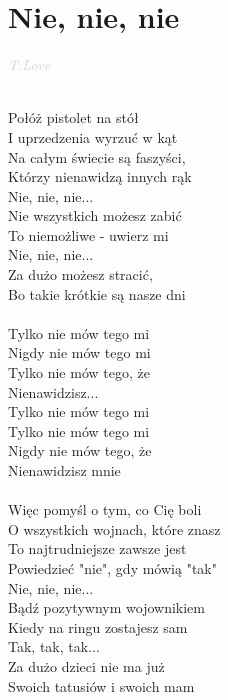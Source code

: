 \documentclass[a5paper, 10pt]{book}
\begin{document}
\newpage
\section{Nie, nie, nie}\textcolor{lightgray}{\textit{T.Love}}\\~\\
\begin{minipage}[t]{0.6\textwidth}
Połóż pistolet na stół\\
I uprzedzenia wyrzuć w kąt\\
Na całym świecie są faszyści,\\
Którzy nienawidzą innych rąk\\
Nie, nie, nie...\\
Nie wszystkich możesz zabić\\
To niemożliwe - uwierz mi\\
Nie, nie, nie...\\
Za dużo możesz stracić,\\
Bo takie krótkie są nasze dni\\
\\
\hspace*{5mm}Tylko nie mów tego mi\\
\hspace*{5mm}Nigdy nie mów tego mi\\
\hspace*{5mm}Tylko nie mów tego, że\\
\hspace*{5mm}Nienawidzisz...\\
\hspace*{5mm}Tylko nie mów tego mi\\
\hspace*{5mm}Tylko nie mów tego mi\\
\hspace*{5mm}Nigdy nie mów tego, że\\
\hspace*{5mm}Nienawidzisz mnie\\
\\
Więc pomyśl o tym, co Cię boli\\
O wszystkich wojnach, które znasz\\
To najtrudniejsze zawsze jest\\
Powiedzieć "nie", gdy mówią "tak"\\
Nie, nie, nie...\\
Bądź pozytywnym wojownikiem\\
Kiedy na ringu zostajesz sam\\
Tak, tak, tak...\\
Za dużo dzieci nie ma już\\
Swoich tatusiów i swoich mam\\
\end{minipage}
\end{document}
